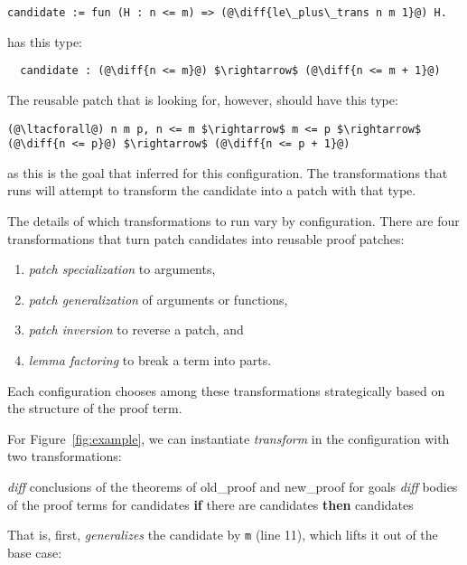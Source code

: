 \begin{lstlisting}[language=coq]
  candidate := fun (H : n <= m) => (@\diff{le\_plus\_trans n m 1}@) H.
\end{lstlisting}
has this type:

\begin{lstlisting}
  candidate : (@\diff{n <= m}@) $\rightarrow$ (@\diff{n <= m + 1}@)
\end{lstlisting}
The reusable patch that \sysname is looking for, however, should have this type:

\begin{lstlisting}[language=coq]
  (@\ltacforall@) n m p, n <= m $\rightarrow$ m <= p $\rightarrow$ (@\diff{n <= p}@) $\rightarrow$ (@\diff{n <= p + 1}@)
\end{lstlisting}
as this is the goal that \sysname inferred for this configuration.
The transformations that \sysname runs will attempt to transform the candidate
into a patch with that type.

The details of which transformations to run vary by configuration.
There are four transformations that turn patch candidates into reusable proof patches:

\begin{enumerate}
\item \textit{patch specialization} to arguments,
\item \textit{patch generalization} of arguments or functions,
\item \textit{patch inversion} to reverse a patch, and
\item \textit{lemma factoring} to break a term into parts.
\end{enumerate}
Each configuration chooses among these transformations strategically based on the structure of the proof term.

For Figure~\ref{fig:example}, we can instantiate \textit{transform} in the configuration with two transformations:

\begin{algorithm}
\footnotesize
\begin{algorithmic}[1]
    \STATE \textit{diff} conclusions of the theorems of old\_proof and new\_proof for goals
    \STATE \textit{diff} bodies of the proof terms for candidates
    \STATE \textbf{if} there are candidates \textbf{then}
    \STATE \hspace*{1em}  candidates
\end{algorithmic}
\end{algorithm}
That is, first, \sysname \textit{generalizes} the candidate by \lstinline{m} (line 11), which lifts it out of the base case:

